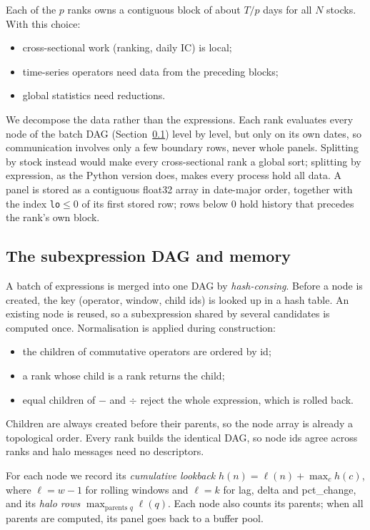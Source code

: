 \documentclass[11pt,a4paper]{article}
\newcommand{\code}[1]{\texttt{#1}}
\begin{document}
Each of the $p$ ranks owns a contiguous block of about $T/p$ days for all $N$ stocks. With this choice:
\begin{itemize}[nosep]
  \item cross-sectional work (ranking, daily IC) is local;
  \item time-series operators need data from the preceding blocks;
  \item global statistics need reductions.
\end{itemize}
We decompose the data rather than the expressions. Each rank evaluates every node of the batch DAG (Section~\ref{sec:dag}) level by level, but only on its own dates, so communication involves only a few boundary rows, never whole panels. Splitting by stock instead would make every cross-sectional rank a global sort; splitting by expression, as the Python version does, makes every process hold all data.
A panel is stored as a contiguous float32 array in date-major order, together with the index \code{lo}$\le0$ of its first stored row; rows below 0 hold history that precedes the rank's own block.

\subsection{The subexpression DAG and memory}
\label{sec:dag}
A batch of expressions is merged into one DAG by \emph{hash-consing}. Before a node is created, the key (operator, window, child ids) is looked up in a hash table. An existing node is reused, so a subexpression shared by several candidates is computed once. Normalisation is applied during construction:
\begin{itemize}[nosep]
  \item the children of commutative operators are ordered by id;
  \item a rank whose child is a rank returns the child;
  \item equal children of $-$ and $\div$ reject the whole expression, which is rolled back.
\end{itemize}
Children are always created before their parents, so the node array is already a topological order. Every rank builds the identical DAG, so node ids agree across ranks and halo messages need no descriptors.

For each node we record its \emph{cumulative lookback} $h(n) = \ell(n) + \max_{c} h(c)$, where $\ell = w-1$ for rolling windows and $\ell = k$ for lag, delta and pct\_change, and its \emph{halo rows} $\max_{\text{parents }q} \ell(q)$. Each node also counts its parents; when all parents are computed, its panel goes back to a buffer pool.
\end{document}
